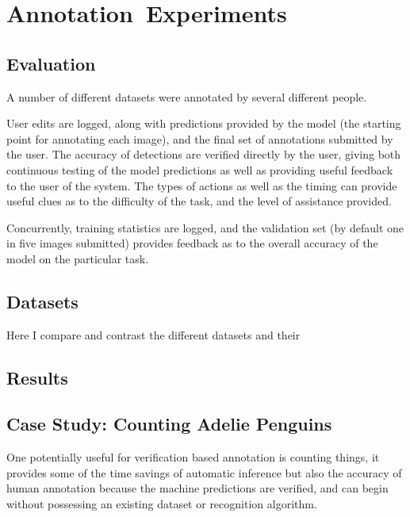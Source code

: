 \chapter{Annotation~Experiments}
\label{chap:annotation} 




\section {Evaluation}

A number of different datasets were annotated by several different people. 

User edits are logged, along with predictions provided by the model (the starting point for annotating each image), and the final set of annotations submitted by the user. The accuracy of detections are verified directly by the user, giving both continuous testing of the model predictions as well as providing useful feedback to the user of the system. The types of actions as well as the timing can provide useful clues as to the difficulty of the task, and the level of assistance provided.

Concurrently, training statistics are logged, and the validation set (by default one in five images submitted) provides feedback as to the overall accuracy of the model on the particular task.




\section{Datasets}

Here I compare and contrast the different datasets and their 



\section{Results}

\section{Case Study: Counting Adelie Penguins}

One potentially useful for verification based annotation is counting things, it provides some of the time savings of automatic inference but also the accuracy of human annotation because the machine predictions are verified, and can begin without possessing an existing dataset or recognition algorithm.


